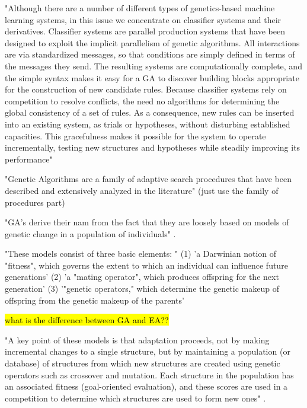 "Although there are a number of different types of genetics-based machine learning systems, in this issue we concentrate on classifier systems and their derivatives. Classifier systems are parallel production systems that have been designed to exploit the implicit parallelism of genetic algorithms. All interactions are via standardized messages, so that conditions are simply defined in terms of the messages they send. The resulting systems are computationally complete, and the simple syntax makes it easy for a GA to discover building blocks appropriate for the construction of new candidate rules. Because classifier systems rely on competition to resolve conflicts, the need no algorithms for determining the global consistency of a set of rules. As a consequence, new rules can be inserted into an existing system, as trials or hypotheses, without disturbing established capacities. This gracefulness makes it possible for the system to operate incrementally, testing new structures and hypotheses while steadily improving its performance"


"Genetic Algorithms are a family of adaptive search procedures that have been described and extensively analyzed in the literature" \cite{de1988learning} (just use the family of procedures part)

"GA's derive their nam from the fact that they are loosely based on models of genetic change in a population of individuals" \cite{de1988learning}.

"These models consist of three basic elements: " \cite{de1988learning}
(1) 'a Darwinian notion of "fitness", which governs the extent to which an individual can influence future generations'
(2) 'a "mating operator", which produces offspring for the next generation'
(3) '"genetic operators," which determine the genetic makeup of offspring from the genetic makeup of the parents'

\hl{what is the difference between GA and EA??}

"A key point of these models is that adaptation proceeds, not by making incremental changes to a single structure, but by maintaining a population (or database) of structures from which new structures are created using genetic operators such as crossover and mutation. Each structure in the population has an associated fitness (goal-oriented evaluation), and these scores are used in a competition to determine which structures are used to form new ones" \cite{de1988learning}.

